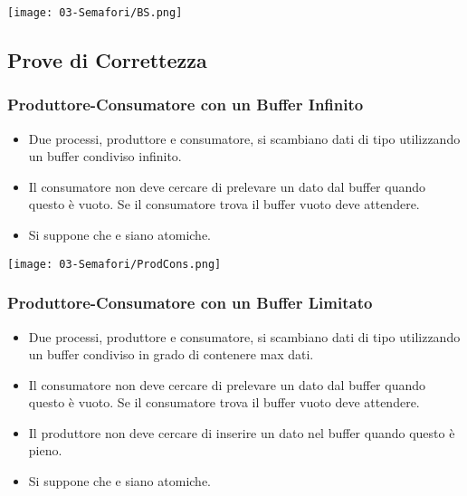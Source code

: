 
\begin{center}
	\texttt{[image: 03-Semafori/BS.png]}
\end{center}

\subsection{Prove di Correttezza}

\subsubsection{Produttore-Consumatore con un Buffer Infinito}

\begin{itemize}
	\item Due processi, produttore e consumatore, si scambiano dati di tipo  utilizzando un buffer condiviso infinito.
	\item Il consumatore non deve cercare di prelevare un dato dal buffer quando questo è vuoto. Se il consumatore trova il buffer vuoto deve attendere.
	\item Si suppone che  e  siano atomiche.
\end{itemize}

\begin{center}
	\texttt{[image: 03-Semafori/ProdCons.png]}
\end{center}

\subsubsection{Produttore-Consumatore con un Buffer Limitato}

\begin{itemize}
	\item Due processi, produttore e consumatore, si scambiano dati di tipo  utilizzando un buffer condiviso in grado di contenere max dati.
	\item Il consumatore non deve cercare di prelevare un dato dal buffer quando questo è vuoto. Se il consumatore trova il buffer vuoto deve attendere.
	\item Il produttore non deve cercare di inserire un dato nel buffer quando questo è pieno.
	\item Si suppone che  e  siano atomiche.
\end{itemize}

